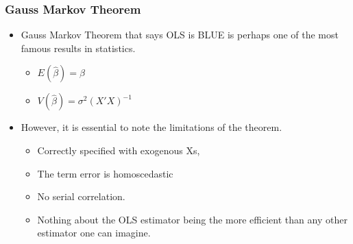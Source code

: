 \documentclass[
  shownotes,
  xcolor={svgnames},
  hyperref={colorlinks,citecolor=DarkBlue,linkcolor=DarkRed,urlcolor=DarkBlue}
  , aspectratio=169]{beamer}
\begin{document}
\begin{frame}
\frametitle{Gauss Markov Theorem}

\begin{itemize}
  \item Gauss Markov Theorem that says OLS is BLUE is perhaps one of the most famous results in statistics. 
  \medskip
  \begin{itemize}
    \item $E(\hat\beta) = \beta$
    \medskip 
    \item $V(\hat \beta ) = \sigma^2 (X'X)^{-1}$
  \end{itemize}
  
\bigskip
  \item However, it is essential to note the limitations of the theorem. 

  \begin{itemize}
    \footnotesize
    \item Correctly specified with exogenous Xs, 
      \medskip 
    \item The term error is homoscedastic 
      \medskip 
    \item No serial correlation.
      \medskip 
    \item Nothing about the OLS estimator being the more efficient than any other estimator one can imagine.
  \end{itemize}
    
  

\end{itemize}

\end{frame}
\end{document}
